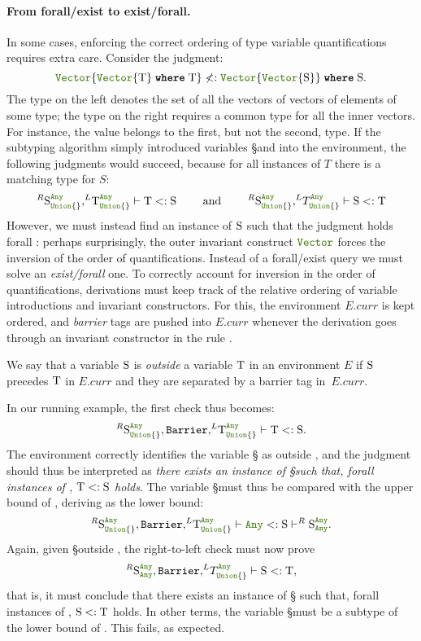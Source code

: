 \paragraph{From forall/exist to exist/forall.}  In some cases,
enforcing the correct ordering of type variable quantifications
requires extra care.  Consider the judgment:
\[ \vectyp{\wheret{\vectyp{\T}}{\T}} \nless: 
  \wheret{\vectyp{\vectyp{\S}}}{\S}. \]
The type on the left denotes the set of all the vectors of
vectors of elements of some type; the type on the right
requires a common type for all the inner
vectors.  For instance, the value
\cjl{[ [1,2],["a","b"] ]} belongs to the first, but
not the second, type.
If the subtyping algorithm simply introduced variables \S and \T into
the environment, the following judgments would succeed, because
for all instances of \(T\) there is a matching type for \(S\):
\[
  ^R \S_{\uniontyp{}}^{\anytyp}, ^L\!\T_{\uniontyp{}}^{\anytyp} \vdash \T <: \S
  \qquad\text{ and }\qquad
  ^R \S_{\uniontyp{}}^{\anytyp}, ^L\!T_{\uniontyp{}}^{\anytyp} \vdash \S <: \T
\]
However, we must instead find an instance of \(\S\) such that 
the judgment holds forall \T: perhaps surprisingly, the outer invariant
construct \(\jlname{Vector}\) forces the inversion of the order of quantifications.
Instead of a forall/exist query we must solve an \emph{exist/forall} one.
To correctly account for inversion in the order of quantifications,
derivations must keep track of the relative ordering of
variable introductions and invariant constructors.  For this, the
environment \(E.curr\) is kept ordered, and
\emph{barrier} tags are pushed into \(E.curr\) whenever the derivation goes through
an invariant constructor in the rule .

We say that a variable \(\S\) is \emph{outside} a variable
\(\T\) in an environment \(E\) if \(\S\) precedes \(\T\)
in \(E.curr\) and they are separated by a barrier tag in~\(E.curr\).  

In our running example, the first check thus becomes:
\[ ^R \S_{\uniontyp{}}^{\anytyp}, \Barrier, ^L\!\T_{\uniontyp{}}^{\anytyp} 
\vdash \T <: \S. \]
\noindent The environment correctly identifies the variable \S
as outside \T, and the judgment should thus be interpreted as
\emph{there exists an instance of \S such that, forall instances of
\T, \( \T <: \S \) holds}.  The variable \S must thus be
compared with the upper bound of \T, deriving \anytyp as the lower bound:
\[ 
  ^R \S_{\uniontyp{}}^{\anytyp}, \Barrier, ^L\!\T_{\uniontyp{}}^{\anytyp} 
  \vdash \anytyp <: \S \vdash ^R \S_{\anytyp}^{\anytyp}.
\]
Again, given \S outside \T, the right-to-left check must now prove
\[ ^R \S_{\anytyp}^{\anytyp}, \Barrier, ^L\!T_{\uniontyp{}}^{\anytyp} 
\vdash \S <: \T, \]
that is, it must conclude that there exists an instance of \S
such that, forall instances of \T, \(\S <: \T\) holds.  In
other terms, the variable \S must be a subtype of the lower
bound of \T.  This fails, as expected.


